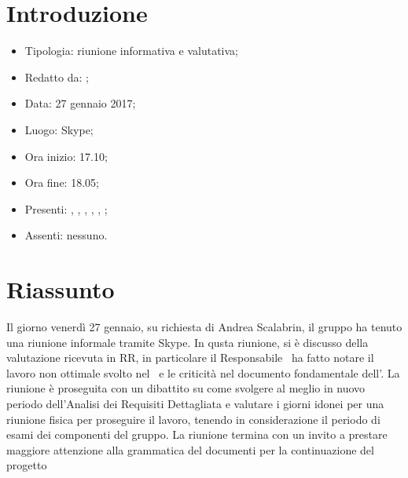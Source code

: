 \section{Introduzione}

	\begin{itemize}
		\item Tipologia: riunione informativa e valutativa;
		\item Redatto da: \MC;
		\item Data: 27 gennaio 2017;
		\item Luogo: Skype;
		\item Ora inizio: 17.10;
		\item Ora fine: 18.05;
		\item Presenti: \AS, \DS, \MC, \NS, \DAN, \AN;	
		\item Assenti: nessuno.	
	\end{itemize}

\section{Riassunto}
Il giorno venerdì 27 gennaio, su richiesta di Andrea Scalabrin, il gruppo ha tenuto una riunione informale tramite Skype. In qusta riunione, si è discusso della valutazione ricevuta in RR, in particolare il Responsabile \AS\ ha fatto notare il lavoro non ottimale svolto nel \PdQ\ e le criticità nel documento fondamentale dell'\AdR. La riunione è proseguita con un dibattito su come svolgere al meglio in nuovo periodo dell'Analisi dei Requisiti Dettagliata e valutare i giorni idonei per una riunione fisica per proseguire il lavoro, tenendo in considerazione il periodo di esami dei componenti del gruppo. La riunione termina con un invito a prestare maggiore attenzione alla grammatica del documenti per la continuazione del progetto